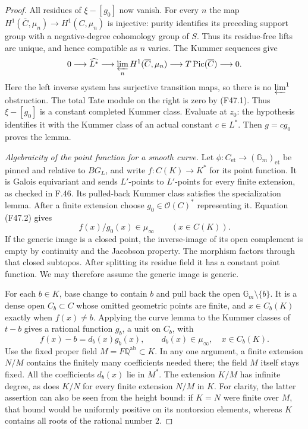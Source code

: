 \begin{proof}
All residues of $\xi-[g_0]$ now vanish. For every $n$ the map
$H^1(\overline C,\mu_n)\to H^1(C,\mu_n)$ is injective: purity
identifies its preceding support group with a negative-degree
cohomology group of $S$. Thus its residue-free lifts are unique,
and hence compatible as $n$ varies. The Kummer sequences give
\[
 0\longrightarrow\widehat{L^*}\longrightarrow
  \varprojlim_n H^1(\overline C,\mu_n)
  \longrightarrow T\operatorname{Pic}(\overline C)
  \longrightarrow0.
\]
Here the left inverse system has surjective transition maps, so
there is no $\varprojlim^1$ obstruction. The total Tate module on
the right is zero by (F47.1). Thus $\xi-[g_0]$ is a constant
completed Kummer class. Evaluate at $z_0$: the hypothesis identifies
it with the Kummer class of an actual constant $c\in L^*$.
Then $g=cg_0$ proves the lemma.

\emph{Algebraicity of the point function for a smooth curve.}
Let
$\phi:C_{\mathrm{et}}\to(\mathbb G_m)_{\mathrm{et}}$
be pinned and relative to $B G_L$, and write
$f:C(K)\to K^*$ for its point function. It is Galois equivariant
and sends $L'$-points to $L'$-points for every finite extension,
as checked in F.46. Its pulled-back Kummer class satisfies the
specialization lemma. After a finite extension choose
$g_0\in\mathcal O(C)^*$ representing it. Equation (F47.2) gives
\[
 f(x)/g_0(x)\in\mu_\infty\qquad(x\in C(K)).                 \tag{F47.4}
\]
If the generic image is a closed point, the inverse-image of its
open complement is empty by continuity and the Jacobson property.
The morphism factors through that closed subtopos. After splitting
its residue field it has a constant point function. We may therefore
assume the generic image is generic.

For each $b\in K$, base change to contain $b$ and pull back the
open $\mathbb G_m\setminus\{b\}$. It is a dense open
$C_b\subset C$ whose omitted geometric points are finite, and
$x\in C_b(K)$ exactly when $f(x)\ne b$. Applying the curve lemma
to the Kummer classes of $t-b$ gives a rational function $g_b$, a
unit on $C_b$, with
\[
 f(x)-b=d_b(x)g_b(x),\qquad d_b(x)\in\mu_\infty,
       \quad x\in C_b(K).                                 \tag{F47.5}
\]
Use the fixed proper field $M=F\mathbb Q^{\mathrm{ab}}\subset K$.
In any one argument, a finite extension $N/M$ contains the finitely
many coefficients needed there; the field $M$ itself stays fixed.
All the coefficients
$d_b(x)$ lie in $M^*$. The extension $K/M$ has infinite degree,
as does $K/N$ for every finite extension $N/M$ in $K$.
For clarity, the latter assertion can also be seen from the height
bound: if $K=N$ were finite over $M$, that bound would be uniformly
positive on its nontorsion elements, whereas $K$ contains all roots
of the rational number $2$.


\end{proof}
